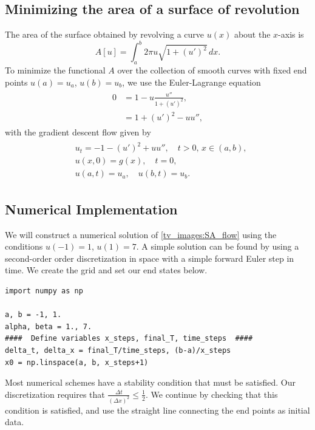 \subsection*{Minimizing the area of a surface of revolution}
The area of the surface obtained by revolving a curve $u(x)$ about the $x$-axis is
\[A[u] = \int_a^b 2 \pi u \sqrt{1 + (u')^2} \, dx.
\]
To minimize the functional $A$ over the collection of smooth curves with fixed end points $u(a) = u_a$, $u(b) = u_b$, we use the Euler-Lagrange equation
\begin{align}
    \begin{split}
    0 &= 1 - u \frac{u''}{1 + (u')^2} , \\
    &= 1 + (u')^2 - u u'',
    \end{split}\label{tv_images:SA_EL_equation}
\end{align}
with the gradient descent flow given by
\begin{align}
    \begin{split}
    &{ } u_t = -1 - (u')^2 + u u'',\quad t > 0,\, x \in (a,b), \\
    &{ } u(x,0) = g(x), \quad t = 0,\\
    &{ } u(a,t) = u_a, \quad u(b,t) = u_b.
    \end{split}\label{tv_images:SA_flow}
\end{align}

\subsection*{Numerical Implementation}
We will construct a numerical solution of \eqref{tv_images:SA_flow} using the conditions $u(-1) = 1$, $u(1) = 7$.
A simple solution can be found by using a second-order order discretization in space  with a simple forward Euler step in time. We create the grid and set our end states below.
\begin{lstlisting}
import numpy as np

a, b = -1, 1.
alpha, beta = 1., 7.
####  Define variables x_steps, final_T, time_steps  ####
delta_t, delta_x = final_T/time_steps, (b-a)/x_steps
x0 = np.linspace(a, b, x_steps+1)
\end{lstlisting}

Most numerical schemes have a stability condition that must be satisfied. Our discretization requires that $\frac{\Delta t}{(\Delta x)^2} \leq \frac{1}{2}$.
We continue by checking that this condition is satisfied, and use the straight line connecting the end points as initial data.

